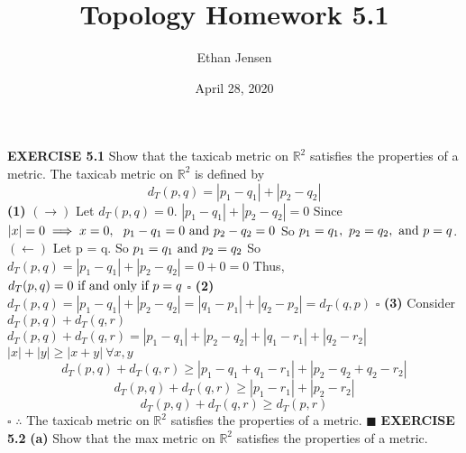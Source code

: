 \documentclass[12pt]{article}
\title{Topology Homework 5.1}
\author{Ethan Jensen}
\date{April 28, 2020}
\begin{document}
  \maketitle
  \noindent
  \textbf{EXERCISE 5.1}
  Show that the taxicab metric on \(\mathbb{R}^2\) satisfies the properties of a metric.
  \newline \newline
  The taxicab metric on \(\mathbb{R}^2\) is defined by
  \[d_T(p,q) = |p_1-q_1|+|p_2-q_2|\]
  \newline
  \textbf{(1)} \((\rightarrow)\) Let \(d_T(p,q) = 0\).
  \newline
  \(|p_1-q_1| + |p_2-q_2| = 0\)
  \newline
  Since \(|x| = 0 \implies x = 0,\ \ p_1 - q_1 = 0 \textup{ and } p_2 - q_2 = 0\)
  \newline
  So \(p_1 = q_1,\ p_2 = q_2, \textup{ and } p = q\).
  \newline \newline
  \((\leftarrow)\) Let p = q.
  \newline
  So \(p_1 = q_1 \textup{ and } p_2 = q_2\)
  \newline
  So \(d_T(p,q) = |p_1-q_1|+|p_2-q_2| = 0+0 = 0\)
  \newline
  Thus, \(d_T(p,q) = 0 \textup{ if and only if } p = q\)
  \newline \(\square\) \newline
  \textbf{(2)} \(d_T(p,q) = |p_1 - q_1| + |p_2 - q_2| = |q_1 - p_1| + |q_2 - p_2| = d_T(q,p)\)
  \newline \(\square\) \newline
  \textbf{(3)} Consider \(d_T(p,q) + d_T(q,r)\)
  \newline
  \(d_T(p,q) + d_T(q,r) = |p_1-q_1| + |p_2-q_2| + |q_1-r_1| + |q_2-r_2|\)
  \newline
  \(|x| + |y| \geq |x+y|\ \forall x,y\)
  \newline
  \[d_T(p,q) + d_T(q,r) \geq |p_1-q_1 + q_1-r_1| + |p_2-q_2 + q_2-r_2|\]
  \[d_T(p,q) + d_T(q,r) \geq |p_1-r_1| + |p_2-r_2|\]
  \[d_T(p,q) + d_T(q,r) \geq d_T(p,r)\]
  \(\square\)
  \newline
  \(\therefore\) The taxicab metric on \(\mathbb{R}^2\) satisfies the properties of a metric.
  \newline \(\blacksquare\)
  \newpage
  \noindent
  \textbf{EXERCISE 5.2}
  \newline
  \textbf{(a)} Show that the max metric on \(\mathbb{R}^2\) satisfies the properties of a metric.
  \newline
\end{document}
